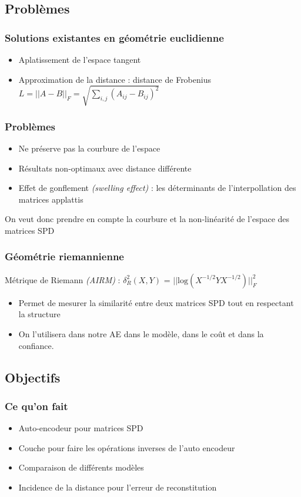 \documentclass{beamer}
\begin{document}
\subsection{Problèmes}
\begin{frame}
    \frametitle{Solutions existantes en géométrie euclidienne}
    \begin{itemize}
    \item Aplatissement de l'espace tangent
    \item Approximation de la distance : distance de Frobenius
    $ L=||A-B||_F = \sqrt{\sum_{i,j}(A_{ij}-B_{ij})^2}$
    \end{itemize}
\end{frame}

\begin{frame}
\frametitle{Problèmes}
\begin{itemize}
\item Ne préserve pas la courbure de l'espace
\item Résultats non-optimaux avec distance différente
\item Effet de gonflement \textit{(swelling effect)} : les déterminants de l'interpollation des matrices applattis
\end{itemize}
On veut donc prendre en compte la courbure et la non-linéarité de l'espace des matrices SPD
\end{frame}
\begin{frame}
    \frametitle{Géométrie riemannienne}
    Métrique de Riemann \textit{(AIRM)} : $\delta^2_R(X,Y)$ = $||\text{log}(X^{-1/2}YX^{-1/2})||^2_F$
    \begin{itemize}
    \item Permet de mesurer la similarité entre deux matrices SPD tout en respectant la structure
    \item On l'utilisera dans notre AE dans le modèle, dans le coût et dans la confiance.
    \end{itemize}
\end{frame}
\subsection{Objectifs}
\begin{frame}
\frametitle{Ce qu'on fait}
\begin{itemize}
    \item Auto-encodeur pour matrices SPD
    \item Couche pour faire les opérations inverses de l'auto encodeur
    \item Comparaison de différents modèles
    \item Incidence de la distance pour l'erreur de reconstitution
\end{itemize}
\end{frame}
\end{document}
